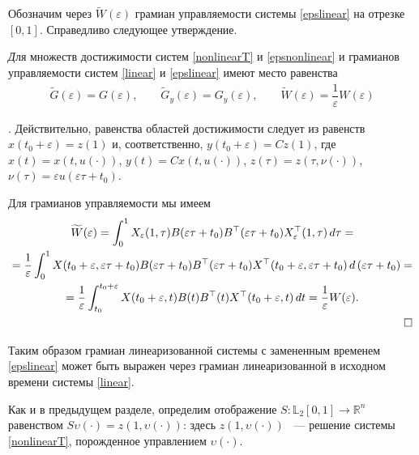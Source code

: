 \documentclass[../main.tex]{subfiles}
\begin{document}
Обозначим через $ \widetilde{W}(\varepsilon) $ грамиан управляемости системы \eqref{epslinear} на отрезке $ [0,1] $. Справедливо следующее утверждение.

\begin{utv}\label{utv}
	{\textit Для множеств достижимости систем \eqref{nonlinearT} и \eqref{epsnonlinear} и грамианов управляемости систем \eqref{linear} и \eqref{epslinear} имеют место равенства}
	\begin{gather*}
		\widetilde{G}(\varepsilon)=G(\varepsilon), \qquad \widetilde{G}_y(\varepsilon)=G_y(\varepsilon), \qquad
		\widetilde{W}(\varepsilon) = \dfrac{1}{\varepsilon} W(\varepsilon)
	\end{gather*}
\end{utv}

\doc. 
Действительно, равенства областей достижимости следует из равенств $ x(t_0 + \varepsilon) = z(1) $ и, соответственно, $ y(t_0+\varepsilon) = C z(1) $, где $ x(t) = x(t,u(\cdot)) $, $ y(t) = C x(t,u(\cdot)) $, $ z(\tau) = z(\tau,\nu(\cdot))  $, $ \nu(\tau) = \varepsilon u(\varepsilon \tau + t_0)  $.

Для грамианов управляемости мы имеем
\begin{gather*}
	\begin{gathered}
		\widetilde{W}(\varepsilon) =
		\int_0^1
		X_{ \varepsilon} (1,\tau)
		B(\varepsilon \tau + t_0)
		B^{\top}(\varepsilon \tau + t_0)
		X_{ \varepsilon}^{\top} (1,\tau) \, d\tau = \\
		= \dfrac{1}{\varepsilon}\int_0^1
		X(t_0+\varepsilon,\varepsilon \tau + t_0)
		B(\varepsilon \tau + t_0)
		B^{\top}(\varepsilon \tau + t_0)
		X^{\top}(t_0+\varepsilon,\varepsilon \tau + t_0) \,
		d\left( \varepsilon\tau + t_0\right) = \\ =
		\dfrac{1}{\varepsilon} \int_{t_0}^{t_0+\varepsilon}
		X(t_0+\varepsilon,t)
		B(t)
		B^{\top}(t)
		X^{\top}(t_0+\varepsilon,t) \, dt = \dfrac{1}{\varepsilon} W(\varepsilon). \\ \hfill \square
	\end{gathered}
\end{gather*}


Таким образом грамиан линеаризованной системы с замененным временем \eqref{epslinear} может быть выражен через грамиан линеаризованной в исходном времени системы \eqref{linear}.
    
    
 Как и в предыдущем разделе, определим отображение $S: \mathbb{L}_2[0,1] \rightarrow \mathbb{R}^n $ равенством $S\upsilon(\cdot) = z(1,\upsilon(\cdot))$: здесь $ z(1,\upsilon(\cdot))$ ~--- решение системы \eqref{nonlinearT}, порожденное управлением $\upsilon(\cdot)$. 
 
\end{document}
